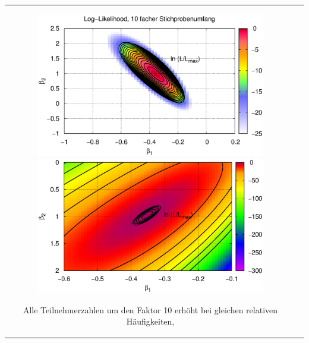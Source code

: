 \documentclass[a4paper]{foils}
\begin{document}
\begin{landscape}
\begin{center}
\newpage
\vspace{-2em}
\begin{tabular}{cc}
\parbox{0.8\textwidth}{
  \includegraphics[width=0.8\textwidth]{./figsDiscr/BNL_kalib_logL10.eps}
\vspace{-4em}\\
  \includegraphics[width=0.8\textwidth]{./figsDiscr/BNL_kalib_logL20.eps}
\vspace{-4em}
}
\hspace{0.1\textwidth}
\parbox{0.4\textwidth}{
Alle Teilnehmerzahlen  um den Faktor 10
erh\"oht  bei gleichen relativen H\"aufigkeiten,
}
\end{tabular}


\end{center}
\end{landscape}
\end{document}
